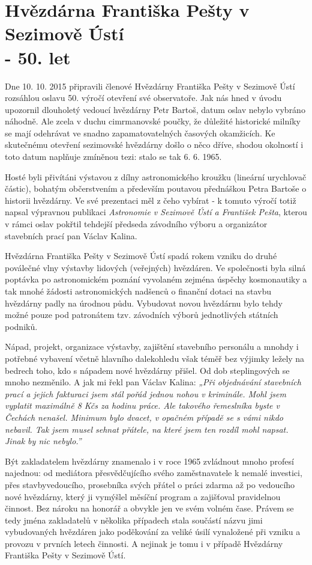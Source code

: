 \documentclass[10pt,a5paper,twoside]{book}
\begin{document}
\section*{Hvězdárna Františka Pešty v Sezimově Ústí \\- 50. let}

Dne 10. 10. 2015 připravili členové Hvězdárny Františka Pešty v Sezimově Ústí rozsáhlou oslavu 50. výročí otevření své observatoře. Jak nás hned v úvodu upozornil dlouholetý vedoucí hvězdárny Petr Bartoš, datum oslav nebylo vybráno náhodně. Ale zcela v duchu cimrmanovské poučky, že důležité historické milníky se mají odehrávat ve snadno zapamatovatelných časových okamžicích. Ke skutečnému otevření sezimovské hvězdárny došlo o něco dříve, shodou okolností i toto datum naplňuje zmíněnou tezi: stalo se tak 6. 6. 1965. 

Hosté byli přivítáni výstavou z dílny astronomického kroužku (lineární urychlovač částic), bohatým občerstvením a především poutavou přednáškou Petra Bartoše o historii hvězdárny. Ve své prezentaci měl z čeho vybírat - k tomuto výročí totiž napsal výpravnou publikaci \textit{Astronomie v Sezimově Ústí a František Pešta}, kterou v rámci oslav pokřtil tehdejší předseda závodního výboru a organizátor stavebních prací pan Václav Kalina.

Hvězdárna Františka Pešty v Sezimově Ústí spadá rokem vzniku do druhé poválečné vlny výstavby lidových (veřejných) hvězdáren.  Ve společnosti byla silná poptávka po astronomickém poznání vyvolaném zejména úspěchy kosmonautiky a tak mnohé žádosti astronomických nadšenců o finanční dotaci na stavbu hvězdárny padly na úrodnou půdu. Vybudovat novou hvězdárnu bylo tehdy možné pouze pod patronátem tzv. závodních výborů jednotlivých státních podniků.

Nápad, projekt, organizace výstavby, zajištění stavebního personálu a mnohdy i potřebné vybavení včetně hlavního dalekohledu však téměř bez výjimky ležely na bedrech toho, kdo s nápadem nové hvězdárny přišel. Od dob steplingových se mnoho nezměnilo. A jak mi řekl pan Václav Kalina: \textit{„Při objednávání stavebních prací a jejich fakturaci jsem stál pořád jednou nohou v kriminále. Mohl jsem vyplatit maximálně 8 Kčs za hodinu práce. Ale takového řemeslníka byste v Čechách nenašel. Minimum bylo dvacet, v opačném případě se s vámi nikdo nebavil. Tak jsem musel sehnat přátele, na které jsem ten rozdíl mohl napsat. Jinak by nic nebylo.”}

Být zakladatelem hvězdárny znamenalo i v roce 1965 zvládnout mnoho profesí najednou: od mediátora přesvědčujícího svého zaměstnavatele k nemalé investici, přes stavbyvedoucího, prosebníka svých přátel o práci zdarma až po vedoucího nové hvězdárny, který ji vymýšlel měsíční program a zajišťoval pravidelnou činnost. Bez nároku na honorář a obvykle jen ve svém volném čase. Právem se tedy jména zakladatelů v několika případech stala součástí názvu jimi vybudovaných hvězdáren jako poděkování za veliké úsilí vynaložené při vzniku a provozu v prvních letech činnosti. A nejinak je tomu i v případě Hvězdárny Františka Pešty v Sezimově Ústí.   
\end{document}
